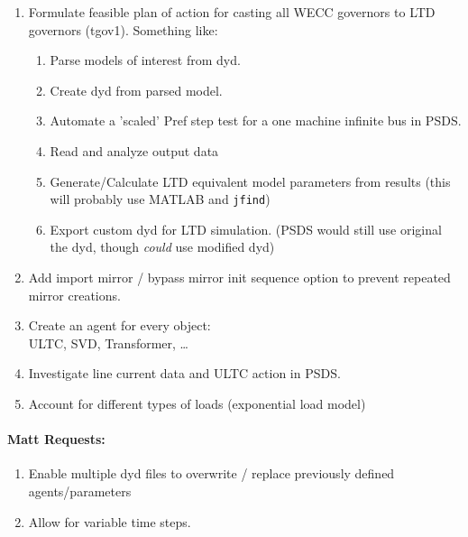\documentclass[12pt]{article}
\begin{document}
\begin{multicols}{2}
\begin{enumerate}
\begin{enumerate}
		\item Formulate feasible plan of action for casting all WECC governors to LTD governors (tgov1). Something like:
		\begin{enumerate}
		\item Parse models of interest from dyd.
		\item Create dyd from parsed model.
		\item Automate a 'scaled' Pref step test for a one machine infinite bus in PSDS.
		\item Read and analyze output data
		\item Generate/Calculate LTD equivalent model parameters from results (this will probably use MATLAB and \verb|jfind|)
		\item Export custom dyd for LTD simulation. (PSDS would still use original the dyd, though \emph{could} use modified dyd)
		\end{enumerate}

		\item Add import mirror / bypass mirror init sequence option to prevent repeated mirror creations.

		\item Create an agent for every object: \\ ULTC, SVD, Transformer, \ldots
		
		\item Investigate line current data and ULTC action in PSDS.
		
		\item Account for different types of loads (exponential load model)
	\end{enumerate}

\paragraph{Matt Requests:}
\begin{enumerate}
		\item Enable multiple dyd files to overwrite / replace previously defined agents/parameters
		\item Allow for variable time steps.
\end{enumerate}

	\end{enumerate}

		

\vfill\null

\end{multicols}
\end{document}
